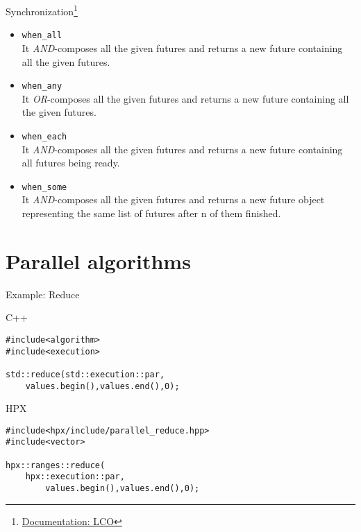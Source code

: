 \documentclass[\classoption]{beamer}
\begin{document}
\begin{frame}[fragile]{Synchronization\footnote{\tiny\href{https://stellar-group.github.io/hpx/docs/sphinx/latest/html/terminology.html\#term-lco}{Documentation: LCO}}}

\begin{itemize}
\item \lstinline|when_all| \\
It \textit{AND}-composes all the given futures and returns a new future containing all the given futures.
\item \lstinline|when_any| \\
It \textit{OR}-composes all the given futures and returns a new future containing all the given futures.
\item \lstinline|when_each| \\
It \textit{AND}-composes all the given futures and returns a new future containing all futures being ready.
\item \lstinline|when_some| \\
It \textit{AND}-composes all the given futures and returns a new future object representing the same list of futures after n of them finished.

\end{itemize}

\end{frame}


\section{Parallel algorithms}


\begin{frame}[fragile]{Example: Reduce}

\begin{block}{C++}
\begin{lstlisting}
#include<algorithm>
#include<execution>

std::reduce(std::execution::par,
	values.begin(),values.end(),0);
\end{lstlisting}
\end{block}

\begin{block}{HPX}
\begin{lstlisting}
#include<hpx/include/parallel_reduce.hpp>
#include<vector>

hpx::ranges::reduce(
	hpx::execution::par,
		values.begin(),values.end(),0);

\end{lstlisting}
\end{block}

\end{frame}
\end{document}
